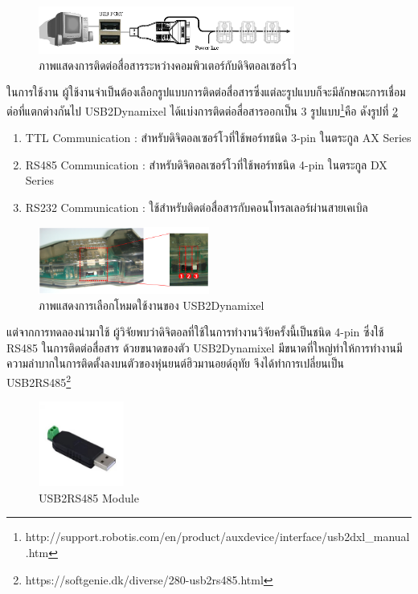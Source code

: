 \begin{figure}[!ht]
    \centering
    \includegraphics[width=0.75\textwidth]{chapter3/images/dynamixel2pc.png}
    \caption{ภาพแสดงการติดต่อสื่อสารระหว่างคอมพิวเตอร์กับดิจิตอลเซอร์โว}
    \label{fig:dynamixel2pc}
\end{figure}

ในการใช้งาน ผู้ใช้งานจำเป็นต้องเลือกรูปแบบการติดต่อสื่อสารซึ่งแต่ละรูปแบบก็จะมีลักษณะการเชื่อมต่อที่แตกต่างกันไป
USB2Dynamixel ได้แบ่งการติดต่อสื่อสารออกเป็น 3 รูปแบบ\footnote{http://support.robotis.com/en/product/auxdevice/interface/usb2dxl\_manual.htm}คือ
ดังรูปที่ \ref{fig:useusb2dynamixel}
\vspace{-10pt}
\begin{enumerate}[label=\arabic*, leftmargin=1.5cm]
    \setlength\itemsep{-0.25em}
    \item TTL Communication : สำหรับดิจิตอลเซอร์โวที่ใช้พอร์ทชนิด 3-pin ในตระกูล AX Series
    \item RS485 Communication : สำหรับดิจิตอลเซอร์โวที่ใช้พอร์ทชนิด 4-pin ในตระกูล DX Series
    \item RS232 Communication : ใช้สำหรับติดต่อสื่อสารกับคอนโทรลเลอร์ผ่านสายเคเบิล
\end{enumerate}
\vspace{-15pt}
\begin{figure}[!ht]
    \centering
    \includegraphics[width=0.5\textwidth]{chapter3/images/useusb2dynamixel.png}
    \caption{ภาพแสดงการเลือกโหมดใช้งานของ USB2Dynamixel}
    \label{fig:useusb2dynamixel}
\end{figure}

แต่จากการทดลองนำมาใช้ ผู้วิจัยพบว่าดิจิตอลที่ใช้ในการทำงานวิจัยครั้งนี้เป็นชนิด 4-pin ซึ่งใช้ RS485 ในการติดต่อสื่อสาร
ด้วยขนาดของตัว USB2Dynamixel มีขนาดที่ใหญ่ทำให้การทำงานมีความลำบากในการติดตั้งลงบนตัวของหุ่นยนต์ฮิวมานอยด์อุทัย
จึงได้ทำการเปลี่ยนเป็น USB2RS485\footnote{https://softgenie.dk/diverse/280-usb2rs485.html}
\begin{figure}[!ht]
    \centering
    \includegraphics[width=0.25\textwidth]{chapter3/images/usb2rs485.jpg}
    \caption{USB2RS485 Module}
    \label{fig:usb2rs485}
\end{figure}

